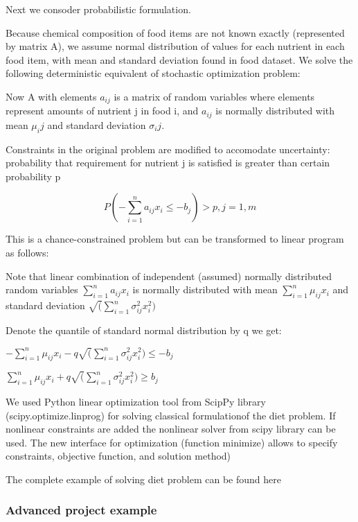Next we consoder probabilistic formulation.

Because chemical composition of food items are not known exactly (represented by matrix A), we assume normal distribution of values for each nutrient in each food item, with mean and standard deviation found in food dataset. We solve the following deterministic equivalent of stochastic optimization problem:

Now A with elements $a_{ij}$ is a matrix of random variables where elements represent amounts of nutrient j in food i, and $a_{ij}$ is normally distributed with mean $\mu_ij$ and standard deviation $\sigma_ij$. 


Constraints in the original problem are modified to accomodate uncertainty: probability that requirement for nutrient j is satisfied is greater than certain probability p 

   \begin{equation} %
  P(  -\sum_{i=1}^{n}{a_{ij}x_i}\le - b_j) >p, j=1,m
    \end{equation}

This is a chance-constrained problem but can be transformed to linear program as follows:

Note that linear combination  of independent (assumed) normally distributed random variables $\sum_{i=1}^{n}{a_{ij}x_i}$ is normally distributed with mean  $\sum_{i=1}^{n}{\mu_{ij}x_i}$  and standard deviation  $\sqrt (\sum_{i=1}^{n}{\sigma_{ij}^2x_i^2})$ 

Denote the quantile of standard normal distribution by q we get:

$-\sum_{i=1}^{n}{\mu_{ij}x_i}-q \sqrt (\sum_{i=1}^{n}{\sigma_{ij}^2x_i^2}) \le -b_j$ 

$\sum_{i=1}^{n}{\mu_{ij}x_i}+q \sqrt (\sum_{i=1}^{n}{\sigma_{ij}^2x_i^2}) \ge b_j$ 


We used Python linear optimization tool  from ScipPy library (scipy.optimize.linprog) for solving classical formulationof the diet problem. If nonlinear constraints are added the nonlinear solver from scipy library can be used. The new interface for optimization (function minimize) allows to specify constraints, objective function, and solution method)

The complete example of solving diet problem can be found here \cite{diet}


      \subsubsection{Advanced project example \label{advannced project example} }

